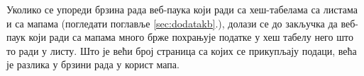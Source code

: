Уколико се упореди брзина рада веб-паука који ради са хеш-табелама са листама и
са мапама (погледати поглавље \ref{sec:dodatakb}.), долази се до закључка да веб-паук који ради са мапама много брже
похрањује податке у хеш табелу него што то ради у листу. Што је већи број
страница са којих се прикупљају подаци, већа је разлика у брзини рада у корист
мапа.


